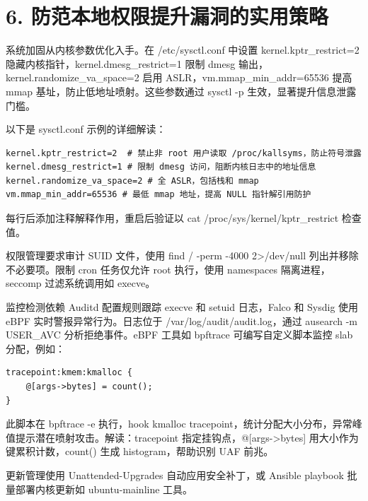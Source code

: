 \chapter{6. 防范本地权限提升漏洞的实用策略}
系统加固从内核参数优化入手。在 /etc/sysctl.conf 中设置 kernel.kptr\_{}restrict=2 隐藏内核指针，kernel.dmesg\_{}restrict=1 限制 dmesg 输出，kernel.randomize\_{}va\_{}space=2 启用 ASLR，vm.mmap\_{}min\_{}addr=65536 提高 mmap 基址，防止低地址喷射。这些参数通过 sysctl -p 生效，显著提升信息泄露门槛。\par
以下是 sysctl.conf 示例的详细解读：\par
\begin{lstlisting}
kernel.kptr_restrict=2  # 禁止非 root 用户读取 /proc/kallsyms，防止符号泄露
kernel.dmesg_restrict=1 # 限制 dmesg 访问，阻断内核日志中的地址信息
kernel.randomize_va_space=2 # 全 ASLR，包括栈和 mmap
vm.mmap_min_addr=65536 # 最低 mmap 地址，提高 NULL 指针解引用防护
\end{lstlisting}
每行后添加注释解释作用，重启后验证以 cat /proc/sys/kernel/kptr\_{}restrict 检查值。\par
权限管理要求审计 SUID 文件，使用 find / -perm -4000 2>/dev/null 列出并移除不必要项。限制 cron 任务仅允许 root 执行，使用 namespaces 隔离进程，seccomp 过滤系统调用如 execve。\par
监控检测依赖 Auditd 配置规则跟踪 execve 和 setuid 日志，Falco 和 Sysdig 使用 eBPF 实时警报异常行为。日志位于 /var/log/audit/audit.log，通过 ausearch -m USER\_{}AVC 分析拒绝事件。eBPF 工具如 bpftrace 可编写自定义脚本监控 slab 分配，例如：\par
\begin{lstlisting}
tracepoint:kmem:kmalloc {
    @[args->bytes] = count();
}
\end{lstlisting}
此脚本在 bpftrace -e 执行，hook kmalloc tracepoint，统计分配大小分布，异常峰值提示潜在喷射攻击。解读：tracepoint 指定挂钩点，@[args->bytes] 用大小作为键累积计数，count() 生成 histogram，帮助识别 UAF 前兆。\par
更新管理使用 Unattended-Upgrades 自动应用安全补丁，或 Ansible playbook 批量部署内核更新如 ubuntu-mainline 工具。\par
